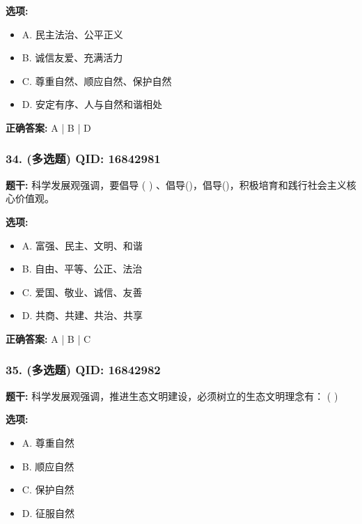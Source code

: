 \documentclass[12pt,UTF8]{ctexart}
\begin{document}
\textbf{选项:}
\begin{itemize}[leftmargin=*]

  \item A. 民主法治、公平正义

  \item B. 诚信友爱、充满活力

  \item C. 尊重自然、顺应自然、保护自然

  \item D. 安定有序、人与自然和谐相处

\end{itemize}

\textbf{正确答案:}
A | B | D

\vspace{0.3em}\hrulefill\vspace{0.7em}

\subsubsection*{34. (多选题) \small QID: 16842981}

\textbf{题干:}
科学发展观强调，要倡导 ( ) 、倡导()，倡导()，积极培育和践行社会主义核心价值观。

\textbf{选项:}
\begin{itemize}[leftmargin=*]

  \item A. 富强、民主、文明、和谐

  \item B. 自由、平等、公正、法治

  \item C. 爱国、敬业、诚信、友善

  \item D. 共商、共建、共治、共享

\end{itemize}

\textbf{正确答案:}
A | B | C

\vspace{0.3em}\hrulefill\vspace{0.7em}

\subsubsection*{35. (多选题) \small QID: 16842982}

\textbf{题干:}
科学发展观强调，推进生态文明建设，必须树立的生态文明理念有： ( )

\textbf{选项:}
\begin{itemize}[leftmargin=*]

  \item A. 尊重自然

  \item B. 顺应自然

  \item C. 保护自然

  \item D. 征服自然

\end{itemize}
\end{document}
